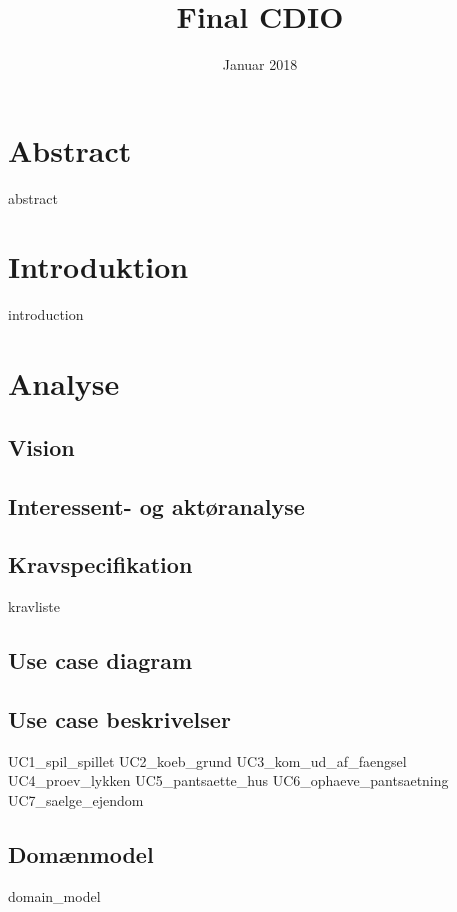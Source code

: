 \documentclass{article}
\title{Final CDIO}
\author{}
\date{Januar 2018}
\begin{document}
{\selectfont
\maketitle
\thispagestyle{empty}
\newpage
\section*{Abstract}
{abstract}
\thispagestyle{empty}
\newpage
\tableofcontents
\thispagestyle{empty}
\newpage
\clearpage
\setcounter{page}{1}

\section{Introduktion}
{introduction}

\section{Analyse}
\subsection{Vision}

\subsection{Interessent- og aktøranalyse}

\subsection{Kravspecifikation}
{kravliste}

\subsection{Use case diagram}
\newpage
\subsection{Use case beskrivelser}
{UC1_spil_spillet}
{UC2_koeb_grund}
{UC3_kom_ud_af_faengsel}
{UC4_proev_lykken}
{UC5_pantsaette_hus}
{UC6_ophaeve_pantsaetning}
{UC7_saelge_ejendom}

\newpage
\subsection{Domænmodel}
{domain_model}

}
\end{document}
